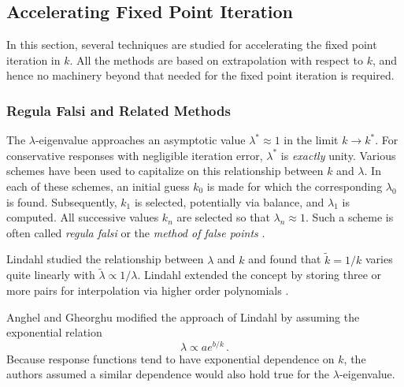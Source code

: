 \subsection{Accelerating Fixed Point Iteration}

In this section, several techniques are studied for 
accelerating the fixed point iteration in $k$.  All 
the methods are based on extrapolation with respect to 
$k$, and hence no machinery beyond that needed for the 
fixed point iteration is required.

\subsubsection{Regula Falsi and Related Methods}
\label{sec:extrapolationmethods}

The $\lambda$-eigenvalue approaches an 
asymptotic value $\lambda^* \approx 1$ in the 
limit $k\to k^*$.  For conservative responses with negligible 
iteration error, $\lambda^*$ is {\it exactly} unity.  
Various 
schemes have been used to capitalize on this relationship between 
$k$ and $\lambda$.  In each of these
schemes, an initial guess $k_0$ is made for which the corresponding 
$\lambda_0$ is found.  Subsequently, $k_1$ is selected, potentially via 
balance, and $\lambda_1$ is computed.  All successive values $k_n$  
are selected so that $\lambda_n \approx 1$.  Such a scheme is often
called {\it regula falsi} or the {\it method of false points} 
\cite{lindahl1976mdr}.

Lindahl studied the relationship between $\lambda$ and $k$ and found that 
$\tilde{k} = 1/k$ varies quite 
linearly with $\tilde{\lambda} \propto 1/\lambda$.
Lindahl extended the concept by storing three or more pairs for interpolation
via higher order polynomials \cite{lindahl1976mdr}.

Anghel and Gheorghu \cite{anghel1987isr}
modified the approach of Lindahl by assuming the 
exponential relation
\begin{equation}
  \lambda \propto a e^{b/k} \, .
\end{equation}
Because response functions tend to have exponential dependence on 
$k$, the authors assumed a similar dependence would also hold true for 
the $\lambda$-eigenvalue. 

